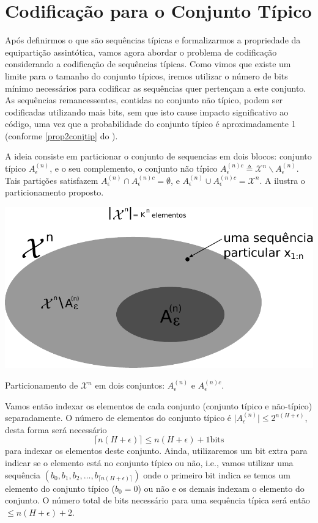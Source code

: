 \section{Codificação para o Conjunto Típico}

Após definirmos o que são sequências típicas e formalizarmos a propriedade da
equipartição assintótica, vamos agora abordar o problema de codificação
considerando a codificação de sequências típicas.  Como vimos que existe um
limite para o tamanho do conjunto típicos, iremos utilizar o número de bits
mínimo necessários para codificar as sequências quer pertençam a este conjunto.
As sequências remancessentes, contidas no conjunto não típico, podem ser
codificadas utilizando mais bits, sem que isto cause impacto significativo ao
código, uma vez que a probabilidade do conjunto típico é aproximadamente 1
(conforme \cref{prop2conjtip} do ).

A ideia consiste em particionar o conjunto de sequencias em dois blocos:
conjunto típico $A_\epsilon^{(n)}$, e o seu complemento, o conjunto não típico 
$A_\epsilon^{(n)c} \triangleq \mathcal{X}^n \backslash A_\epsilon^{(n)}$.
Tais partições satisfazem $A_\epsilon^{(n)} \cap A_\epsilon^{(n)c} = \emptyset$, 
e $A_\epsilon^{(n)} \cup A_\epsilon^{(n)c} = \mathcal{X}^n$. A 
ilustra o particionamento proposto.

\begin{marginfigure}%
  \includegraphics[width=\linewidth]{figures/particao2.pdf}
  \caption{Particionamento de $\mathcal{X}^n$ em dois conjuntos: $A_\epsilon^{(n)}$ e $A_\epsilon^{(n)c}$.}
  \label{fig:particao2}
\end{marginfigure}

Vamos então indexar os elementos de cada conjunto (conjunto típico e não-típico) separadamente.
O número de elementos do conjunto típico é $\vert A_\epsilon^{(n)} \vert \leq 2^{n(H+\epsilon)}$,
desta forma será necessário
\begin{equation}
  \lceil n(H+\epsilon) \rceil \leq n (H + \epsilon) + 1 \text{bits}
\end{equation}
para indexar os elementos deste conjunto.
Ainda, utilizaremos um bit extra para indicar se o elemento está no conjunto típico ou não, i.e.,
vamos utilizar uma sequência $(b_0,b_1,b_2,\ldots,b_{\lceil n(H+\epsilon) \rceil})$ onde
o primeiro bit indica se temos um elemento do conjunto típico ($b_0=0$) ou não
e os demais indexam o elemento do conjunto.
O número total de bits necessário para uma sequência típica será então $\leq n(H+\epsilon)+2$.

